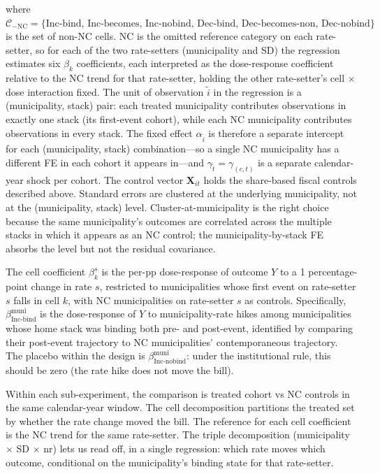 \documentclass[12pt]{article}
\begin{document}
where
$\mathcal{C}_{-\text{NC}} = \{\text{Inc-bind, Inc-becomes, Inc-nobind, Dec-bind, Dec-becomes-non, Dec-nobind}\}$ is the set of non-NC cells. NC is the omitted reference category on each rate-setter, so for each of the two rate-setters (municipality and SD) the regression estimates six $\beta_k$ coefficients, each interpreted as the dose-response coefficient relative to the NC trend for that rate-setter, holding the other rate-setter's cell $\times$ dose interaction fixed. The unit of observation $\tilde{i}$ in the regression is a (municipality, stack) pair: each treated municipality contributes observations in exactly one stack (its first-event cohort), while each NC municipality contributes observations in every stack. The fixed effect $\alpha_{\tilde{i}}$ is therefore a separate intercept for each (municipality, stack) combination---so a single NC municipality has a different FE in each cohort it appears in---and $\gamma_{\tilde{t}} = \gamma_{(c, t)}$ is a separate calendar-year shock per cohort. The control vector $\mathbf{X}_{it}$ holds the share-based fiscal controls described above. Standard errors are clustered at the underlying municipality, not at the (municipality, stack) level. Cluster-at-municipality is the right choice because the same municipality's outcomes are correlated across the multiple stacks in which it appears as an NC control; the municipality-by-stack FE absorbs the level but not the residual covariance.

The cell coefficient $\beta^s_k$ is the per-pp dose-response of outcome
$Y$ to a 1 percentage-point change in rate $s$, restricted to municipalities
whose first event on rate-setter $s$ falls in cell $k$, with NC municipalities on
rate-setter $s$ as controls. Specifically, $\beta^{\text{muni}}_{\text{Inc-bind}}$
is the dose-response of $Y$ to municipality-rate hikes among municipalities whose home
stack was binding both pre- and post-event, identified by comparing
their post-event trajectory to NC municipalities' contemporaneous trajectory.
The placebo within the design is
$\beta^{\text{muni}}_{\text{Inc-nobind}}$: under the institutional rule,
this should be zero (the rate hike does not move the bill).

Within each sub-experiment, the comparison is
treated cohort vs NC controls in the same calendar-year window.
The cell decomposition partitions the treated set by whether the rate
change moved the bill. The reference for each cell coefficient is the
NC trend for the same rate-setter. The triple decomposition (municipality $\times$ SD
$\times$ nr) lets us read off, in a single regression: which rate moves
which outcome, conditional on the municipality's binding state for that rate-setter.
\end{document}
